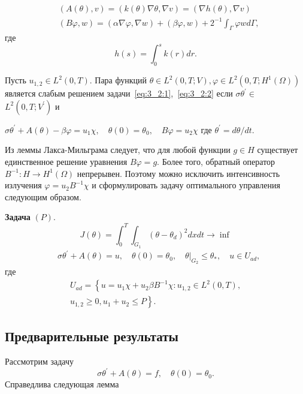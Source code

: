 \[
    \begin{aligned}
        &(A(\theta), v)=(k(\theta) \nabla \theta, \nabla v)=(\nabla h(\theta), \nabla v) \\
        &(B \varphi, w)=(\alpha \nabla \varphi, \nabla w)+(\beta \varphi, w)+2^{-1}
        \int_{\Gamma} \varphi w d \Gamma,
    \end{aligned}
\]
где
\[
    h(s)=\int_{0}^{s} k(r) d r.
\]

\begin{definition}
    Пусть $u_{1,2} \in L^{2}(0, T)$.
    Пара функций $\theta \in L^{2}(0, T ; V), \varphi \in L^{2}\left(0, T ; H^{1}(\Omega)\right)$
    является слабым решением задачи~\eqref{eq:3_2:1},~\eqref{eq:3_2:2}
    если $\sigma \theta^{\prime} \in$ $L^{2}\left(0, T ; V^{\prime}\right)$ и

    $\sigma \theta^{\prime}+A(\theta)-\beta \varphi=u_{1} \chi, \quad \theta(0)=\theta_{0},
    \quad B \varphi=u_{2} \chi$ где $\theta^{\prime}=d \theta / d t$.
\end{definition}

Из леммы Лакса-Мильграма следует, что для любой функции $g \in H$
существует единственное решение уравнения $B \varphi=g$.
Более того, обратный оператор $B^{-1}: H \rightarrow H^{1}(\Omega)$ непрерывен.
Поэтому можно исключить интенсивность излучения $\varphi=u_{2} B^{-1} \chi$ и
сформулировать задачу оптимального управления следующим образом.


\textbf{Задача} $(P)$.
    \[
        J(\theta)=\int_{0}^{T}
        \int_{G_{1}}\left(\theta-\theta_{d}\right)^{2} d x d t \rightarrow \inf
    \]
    \[
        \begin{aligned}
            & \sigma \theta^{\prime}+A(\theta)=u,
            \quad \theta(0)=\theta_{0},\left.\quad
            \theta\right|_{G_{2}} \leq \theta_{*},
            \quad u \in U_{a d},
        \end{aligned}
    \]
    где
    \[
        \begin{array}{r}
            U_{a d}=\left\{u=u_{1} \chi+u_{2} \beta B^{-1}
            \chi: u_{1,2} \in L^{2}(0, T),\right. \\
            \left.u_{1,2} \geq 0, u_{1}+u_{2} \leq P\right\}.
        \end{array}
    \]

\subsection{Предварительные результаты}
\label{subsec:ch3:sec2:subsec4}
Рассмотрим задачу
\begin{equation}
    \label{eq:3_2:3}
    \sigma \theta^{\prime}+A(\theta)=f, \quad \theta(0)=\theta_{0}.
\end{equation}
Справедлива следующая лемма


